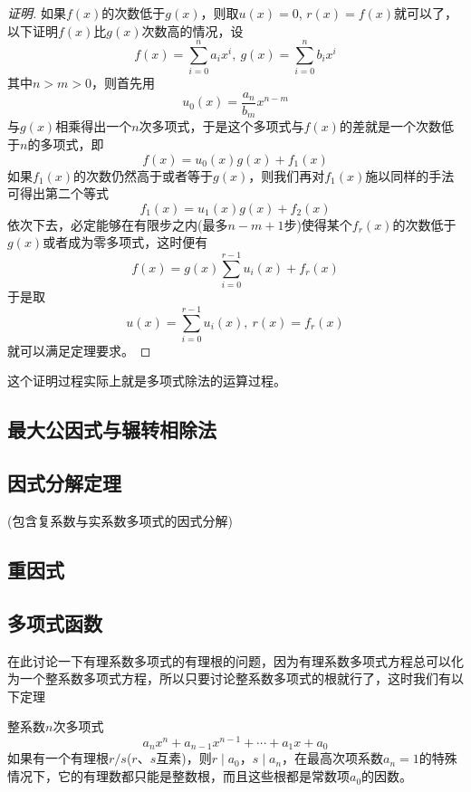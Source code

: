 \begin{proof}[证明]
  如果$f(x)$的次数低于$g(x)$，则取$u(x)=0$, $r(x)=f(x)$就可以了，以下证明$f(x)$比$g(x)$次数高的情况，设
  \[ f(x)=\sum_{i=0}^na_ix^i, \   g(x)=\sum_{i=0}^nb_ix^i \]
  其中$n>m>0$，则首先用
  \[ u_0(x)=\frac{a_n}{b_m}x^{n-m} \]
  与$g(x)$相乘得出一个$n$次多项式，于是这个多项式与$f(x)$的差就是一个次数低于$n$的多项式，即
  \[ f(x) = u_0(x) g(x) + f_1(x) \]
  如果$f_1(x)$的次数仍然高于或者等于$g(x)$，则我们再对$f_1(x)$施以同样的手法可得出第二个等式
  \[ f_1(x) = u_1(x)g(x) + f_2(x) \]
  依次下去，必定能够在有限步之内(最多$n-m+1$步)使得某个$f_r(x)$的次数低于$g(x)$或者成为零多项式，这时便有
  \[ f(x) = g(x) \sum_{i=0}^{r-1}u_i(x) + f_r(x) \]
  于是取
  \[ u(x)=\sum_{i=0}^{r-1}u_i(x), \  r(x)=f_r(x) \]
  就可以满足定理要求。
\end{proof}

这个证明过程实际上就是多项式除法的运算过程。

\subsection{最大公因式与辗转相除法}
\label{sec:greatest-common-divisor-and-euclidean-division}

\subsection{因式分解定理}
\label{sec:factoring-theorem}

(包含复系数与实系数多项式的因式分解)

\subsection{重因式}
\label{sec:mulitple-factor}

\subsection{多项式函数}
\label{sec:polynome-function}

在此讨论一下有理系数多项式的有理根的问题，因为有理系数多项式方程总可以化为一个整系数多项式方程，所以只要讨论整系数多项式的根就行了，这时我们有以下定理
\begin{theorem}
  整系数$n$次多项式
  \[ a_nx^n+a_{n-1}x^{n-1}+\cdots+a_1x+a_0 \]
  如果有一个有理根$r/s$($r$、$s$互素)，则$r \mid a_0$，$s \mid a_n$，在最高次项系数$a_n=1$的特殊情况下，它的有理数都只能是整数根，而且这些根都是常数项$a_0$的因数。
\end{theorem}

